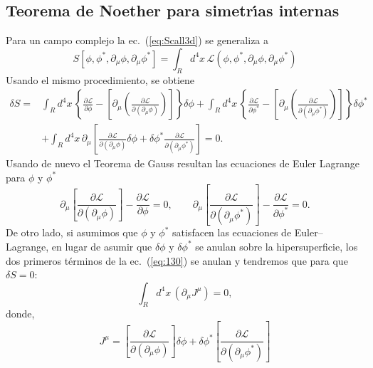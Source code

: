 \subsection{Teorema de Noether para simetr\'\i as internas}
Para un campo complejo la ec.~(\ref{eq:Scall3d}) se generaliza a
\begin{equation}
  S[\phi,\phi^*,\partial_\mu\phi,\partial_\mu\phi^*]=\int_{R}d^4x\,\mathcal{L}(\phi,\phi^*,\partial_\mu\phi,\partial_\mu\phi^*)
\end{equation}
Usando el mismo procedimiento, se obtiene
\begin{align}
  \label{eq:130}
   \delta S=&\int_{R}d^4x\,
  \left\{ 
    \frac{\partial\mathcal{L}}{\partial\phi}-
  \left[\partial_\mu\left(
      \frac{\partial\mathcal{L}}{\partial(\partial_\mu\phi)}
    \right)\right]
  \right\}\delta\phi
+\int_{R}d^4x\,
  \left\{ 
    \frac{\partial\mathcal{L}}{\partial\phi^*}-
  \left[\partial_\mu\left(
      \frac{\partial\mathcal{L}}{\partial(\partial_\mu\phi^*)}
    \right)\right]
  \right\}\delta\phi^*\nonumber\\
&+\int_{R}d^4x\,
    \partial_\mu\left[
      \frac{\partial\mathcal{L}}{\partial(\partial_\mu\phi)}\delta\phi+
      \delta\phi^*\frac{\partial\mathcal{L}}{\partial(\partial_\mu\phi^*)}
    \right]=0.
\end{align}
Usando de nuevo el Teorema de Gauss resultan las ecuaciones de Euler Lagrange para $\phi$ y $\phi^*$
\begin{equation}
\label{eq:132}
  \partial_\mu
  \left[
    \frac{\partial\mathcal{L}}{\partial
      (\partial_\mu\phi)}
  \right]-\frac{\partial\mathcal{L}}{\partial\phi}=0, \qquad
  \partial_\mu
  \left[
    \frac{\partial\mathcal{L}}{\partial
      (\partial_\mu\phi^*)}
  \right]-\frac{\partial\mathcal{L}}{\partial\phi^*}=0.
\end{equation}
De otro lado, si asumimos que $\phi$ y $\phi^*$ satisfacen las ecuaciones de Euler--Lagrange, en lugar de asumir que $\delta\phi$ y $\delta\phi^*$ se anulan sobre la hipersuperficie, los dos primeros t\'erminos de la ec.~(\ref{eq:130}) se anulan y tendremos que para que $\delta S=0$:
\begin{equation}
  \label{eq:jmu}
  \int_{R}d^4x\,(\partial_\mu J^\mu)=0,
\end{equation}
donde,
\begin{equation}
  \label{eq:jmuphi}
 J^\mu= \left[
      \frac{\partial\mathcal{L}}{\partial(\partial_\mu\phi)}
    \right]\delta\phi+\delta\phi^*\left[
      \frac{\partial\mathcal{L}}{\partial(\partial_\mu\phi^*)}
    \right]
\end{equation}
